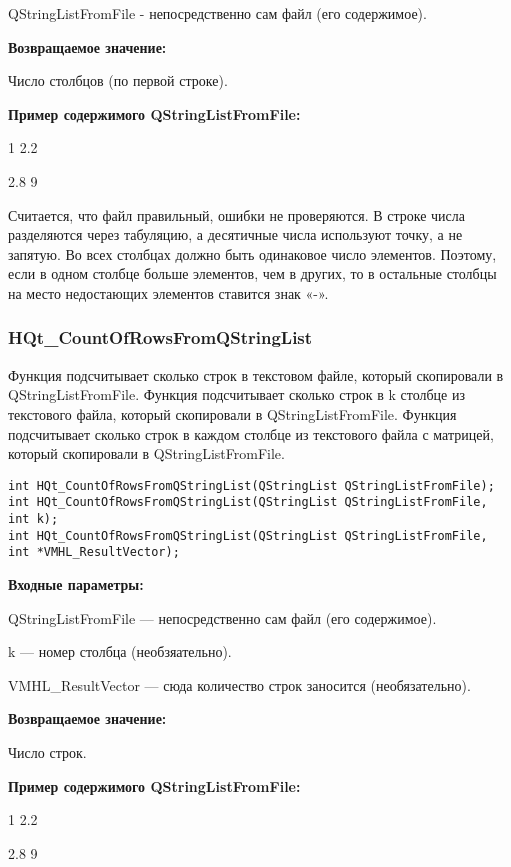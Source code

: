 \documentclass[a4paper,12pt]{article}
\begin{document}
QStringListFromFile - непосредственно сам файл (его содержимое).

\textbf{Возвращаемое значение:}

Число столбцов (по первой строке).

\textbf{Пример содержимого QStringListFromFile:}

1	2.2

2.8	9

Считается, что файл правильный, ошибки не проверяются. В строке числа разделяются через табуляцию, а десятичные числа используют точку, а не запятую. Во всех столбцах должно быть одинаковое число элементов. Поэтому, если в одном столбце больше элементов, чем в других, то в остальные столбцы на место недостающих элементов ставится знак «-».


\subsubsection{HQt\_CountOfRowsFromQStringList}\label{HQt_CountOfRowsFromQStringList}

Функция подсчитывает сколько строк в текстовом файле, который скопировали в QStringListFromFile. Функция подсчитывает сколько строк в k столбце из текстового файла, который скопировали в QStringListFromFile. Функция подсчитывает сколько строк в каждом столбце из текстового файла с матрицей, который скопировали в QStringListFromFile.


\begin{lstlisting}[label=code_syntax_HQt_CountOfRowsFromQStringList,caption=Синтаксис]
int HQt_CountOfRowsFromQStringList(QStringList QStringListFromFile);
int HQt_CountOfRowsFromQStringList(QStringList QStringListFromFile, int k);
int HQt_CountOfRowsFromQStringList(QStringList QStringListFromFile, int *VMHL_ResultVector);
\end{lstlisting}

\textbf{Входные параметры:}

QStringListFromFile --- непосредственно сам файл (его содержимое).

k --- номер столбца (необзяательно).

 VMHL\_ResultVector --- сюда количество строк заносится (необязательно).

\textbf{Возвращаемое значение:}

Число строк.

\textbf{Пример содержимого QStringListFromFile:}

1	2.2

2.8	9
\end{document}
